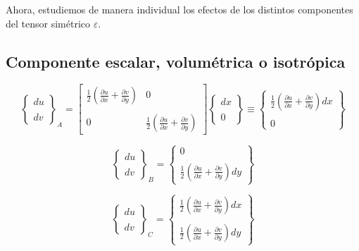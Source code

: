 \documentclass[../notas medios.tex]{subfiles}
\begin{document}
Ahora, estudiemos de manera individual los efectos de los distintos componentes 
del tensor simétrico $\varepsilon$.

\subsection{Componente escalar, volumétrica o isotrópica}
\[{\left\{ {\begin{array}{*{20}{c}}
{du}\\\\
{dv}
\end{array}} \right\}_A} = \left[ {\begin{array}{*{20}{c}}
{\frac{1}{2}\left( {\frac{{\partial u}}{{\partial x}} + \frac{{\partial v}}{{\partial y}}} \right)}&0\\\\
0&{\frac{1}{2}\left( {\frac{{\partial u}}{{\partial x}} + \frac{{\partial v}}{{\partial y}}} \right)}
\end{array}} \right]\left\{ {\begin{array}{*{20}{c}}
{dx}\\\\
0
\end{array}} \right\} \equiv \left\{ {\begin{array}{*{20}{c}}
{\frac{1}{2}\left( {\frac{{\partial u}}{{\partial x}} + \frac{{\partial v}}{{\partial y}}} \right)dx}\\\\
0
\end{array}} \right\}\]

\[{\left\{ {\begin{array}{*{20}{c}}
{du}\\\\
{dv}
\end{array}} \right\}_B} = \left\{ {\begin{array}{*{20}{c}}
0\\\\
{\frac{1}{2}\left( {\frac{{\partial u}}{{\partial x}} + \frac{{\partial v}}{{\partial y}}} \right)dy}
\end{array}} \right\}\]

\[{\left\{ {\begin{array}{*{20}{c}}
{du}\\\\
{dv}
\end{array}} \right\}_C} = \left\{ {\begin{array}{*{20}{c}}
{\frac{1}{2}\left( {\frac{{\partial u}}{{\partial x}} + \frac{{\partial v}}{{\partial y}}} \right)dx}\\\\
{\frac{1}{2}\left( {\frac{{\partial u}}{{\partial x}} + \frac{{\partial v}}{{\partial y}}} \right)dy}
\end{array}} \right\}\]
\end{document}
